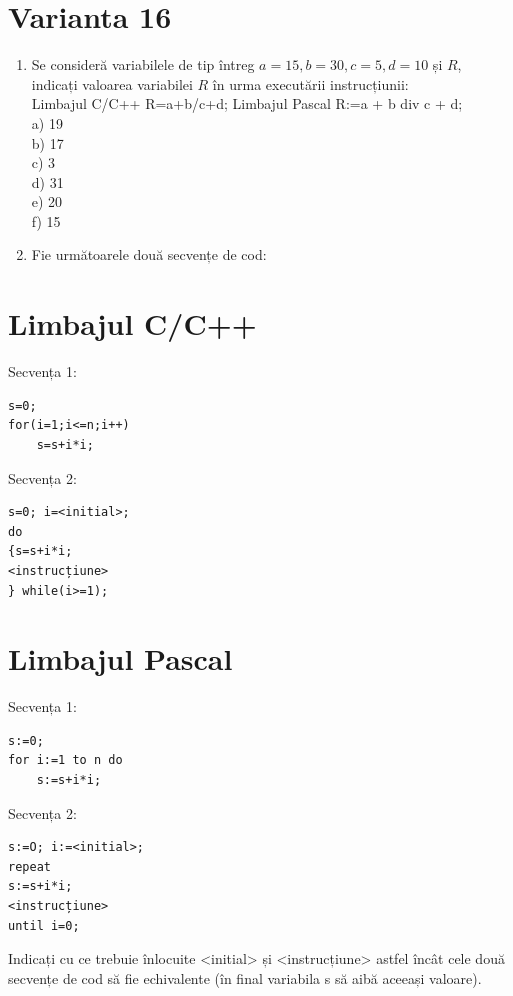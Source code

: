 \documentclass[10pt]{article}
\begin{document}
\section*{Varianta 16}
\begin{enumerate}
  \item Se consideră variabilele de tip întreg $a=15, b=30, c=5, d=10$ și $R$, indicați valoarea variabilei $R$ în urma executării instrucțiunii:\\
Limbajul C/C++ R=a+b/c+d; Limbajul Pascal R:=a + b div c + d;\\
a) 19\\
b) 17\\
c) 3\\
d) 31\\
e) 20\\
f) 15
  \item Fie următoarele două secvențe de cod:
\end{enumerate}

\section*{Limbajul C/C++}
Secvența 1:

\begin{verbatim}
s=0;
for(i=1;i<=n;i++)
    s=s+i*i;
\end{verbatim}

Secvența 2:

\begin{verbatim}
s=0; i=<initial>;
do
{s=s+i*i;
<instrucțiune>
} while(i>=1);
\end{verbatim}

\section*{Limbajul Pascal}
Secvența 1:

\begin{verbatim}
s:=0;
for i:=1 to n do
    s:=s+i*i;
\end{verbatim}

Secvența 2:

\begin{verbatim}
s:=O; i:=<initial>;
repeat
s:=s+i*i;
<instrucțiune>
until i=0;
\end{verbatim}

Indicați cu ce trebuie înlocuite <initial> și <instrucțiune> astfel încât cele două secvențe de cod să fie echivalente (în final variabila s să aibă aceeași valoare).
\end{document}
